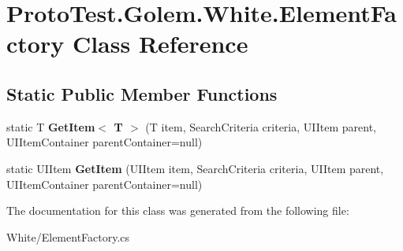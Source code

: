 \hypertarget{class_proto_test_1_1_golem_1_1_white_1_1_element_factory}{\section{Proto\-Test.\-Golem.\-White.\-Element\-Factory Class Reference}
\label{class_proto_test_1_1_golem_1_1_white_1_1_element_factory}
}
\subsection*{Static Public Member Functions}
\begin{DoxyCompactItemize}
\item 
\hypertarget{class_proto_test_1_1_golem_1_1_white_1_1_element_factory_af5dc59676534af1d209f3f2c2d518187}{static T {\bfseries Get\-Item$<$ T $>$} (T item, Search\-Criteria criteria, U\-I\-Item parent, U\-I\-Item\-Container parent\-Container=null)}\label{class_proto_test_1_1_golem_1_1_white_1_1_element_factory_af5dc59676534af1d209f3f2c2d518187}

\item 
\hypertarget{class_proto_test_1_1_golem_1_1_white_1_1_element_factory_a6cf8921ea4443c59133d5cf79b44d5ba}{static U\-I\-Item {\bfseries Get\-Item} (U\-I\-Item item, Search\-Criteria criteria, U\-I\-Item parent, U\-I\-Item\-Container parent\-Container=null)}\label{class_proto_test_1_1_golem_1_1_white_1_1_element_factory_a6cf8921ea4443c59133d5cf79b44d5ba}

\end{DoxyCompactItemize}


The documentation for this class was generated from the following file\-:\begin{DoxyCompactItemize}
\item 
White/Element\-Factory.\-cs\end{DoxyCompactItemize}
